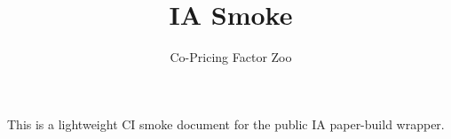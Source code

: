 \documentclass{article}
\title{IA Smoke}
\author{Co-Pricing Factor Zoo}
\date{}
\begin{document}
\maketitle

This is a lightweight CI smoke document for the public IA paper-build wrapper.



\end{document}
